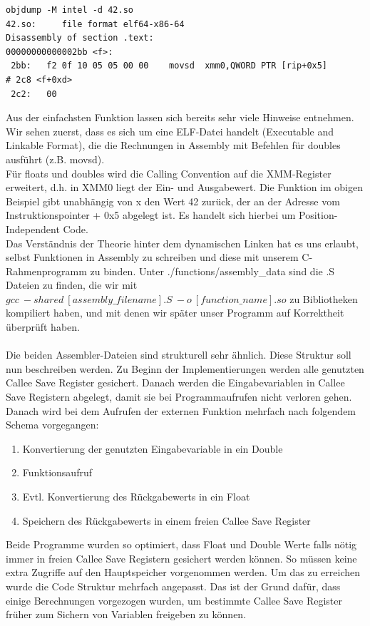 \documentclass[course=erap]{aspdoc}
\begin{document}
\begin{lstlisting}[frame=single]
objdump -M intel -d 42.so
42.so:     file format elf64-x86-64
Disassembly of section .text:
00000000000002bb <f>:
 2bb:   f2 0f 10 05 05 00 00    movsd  xmm0,QWORD PTR [rip+0x5]        # 2c8 <f+0xd>
 2c2:   00

\end{lstlisting}
Aus der einfachsten Funktion lassen sich bereits sehr viele Hinweise entnehmen. Wir sehen zuerst, dass es sich um eine ELF-Datei handelt (Executable and Linkable Format), die die Rechnungen in Assembly mit Befehlen für doubles ausführt (z.B. movsd).\\
Für floats und doubles wird die Calling Convention auf die XMM-Register erweitert, d.h. in XMM0 liegt der Ein- und Ausgabewert. Die Funktion im obigen Beispiel gibt unabhängig von x den Wert 42 zurück, der an der Adresse vom Instruktionspointer + 0x5 abgelegt ist. Es handelt sich hierbei um Position-Independent Code.\\
Das Verständnis der Theorie hinter dem dynamischen Linken hat es uns erlaubt, selbst Funktionen in Assembly zu schreiben und diese mit unserem C-Rahmenprogramm zu binden. Unter ./functions/assembly\_data sind die .S Dateien zu finden, die wir mit $gcc\ -shared\ [assembly\_filename].S\ -o\ [function\_name].so$ zu Bibliotheken kompiliert haben, und  mit denen wir später unser Programm auf Korrektheit überprüft haben.\\
\\
Die beiden Assembler-Dateien sind strukturell sehr ähnlich. Diese Struktur soll nun beschreiben werden. Zu Beginn der Implementierungen werden alle genutzten Callee Save Register gesichert. Danach werden die Eingabevariablen in Callee Save Registern abgelegt, damit sie bei Programmaufrufen nicht verloren gehen. Danach wird bei dem Aufrufen der externen Funktion mehrfach nach folgendem Schema vorgegangen:
\begin{enumerate}
\item Konvertierung der genutzten Eingabevariable in ein Double
\item Funktionsaufruf
\item Evtl. Konvertierung des Rückgabewerts in ein Float
\item Speichern des Rückgabewerts in einem freien Callee Save Register\\
\end{enumerate}
Beide Programme wurden so optimiert, dass Float und Double Werte falls nötig immer in freien Callee Save Registern gesichert werden können. So müssen keine extra Zugriffe auf den Hauptspeicher vorgenommen werden. Um das zu erreichen wurde die Code Struktur mehrfach angepasst. Das ist der Grund dafür, dass einige Berechnungen vorgezogen wurden, um bestimmte Callee Save Register früher zum Sichern von Variablen freigeben zu können.\\
\end{document}
